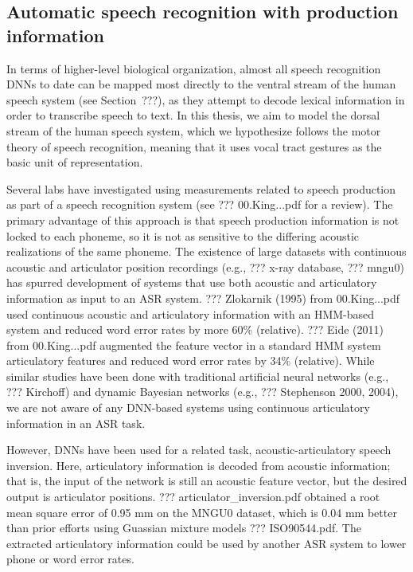 \subsection{Automatic speech recognition with production information}

In terms of higher-level biological organization,
almost all speech recognition DNNs to date
can be mapped most directly
to the ventral stream of the human speech system
(see Section~???),
as they attempt to decode
lexical information in order to
transcribe speech to text.
In this thesis, we aim to model
the dorsal stream of the human speech system,
which we hypothesize follows the
motor theory of speech recognition,
meaning that it uses vocal tract gestures
as the basic unit of representation.

Several labs have investigated
using measurements
related to speech production
as part of a speech recognition system
(see ??? 00.King...pdf for a review).
The primary advantage of this approach
is that speech production information
is not locked to each phoneme,
so it is not as sensitive to the
differing acoustic realizations
of the same phoneme.
The existence of large datasets
with continuous acoustic
and articulator position recordings
(e.g., ??? x-ray database, ??? mngu0)
has spurred development of
systems that use both
acoustic and articulatory information
as input to an ASR system.
??? Zlokarnik (1995) from 00.King...pdf
used continuous acoustic and articulatory
information with an HMM-based system
and reduced word error rates
by more 60\% (relative).
??? Eide (2011) from 00.King...pdf
augmented the feature vector
in a standard HMM system
articulatory features and
reduced word error rates
by 34\% (relative).
While similar studies have been done
with traditional artificial neural networks
(e.g., ??? Kirchoff)
and dynamic Bayesian networks
(e.g., ??? Stephenson 2000, 2004),
we are not aware of
any DNN-based systems using
continuous articulatory
information in an ASR task.

However, DNNs have been used for
a related task,
acoustic-articulatory speech inversion.
Here, articulatory information
is decoded from acoustic information;
that is, the input of the network
is still an acoustic feature vector,
but the desired output
is articulator positions.
??? articulator_inversion.pdf
obtained a root mean square error
of 0.95 mm on the MNGU0 dataset,
which is 0.04 mm better than prior
efforts using Guassian mixture models
??? ISO90544.pdf.
The extracted articulatory information
could be used by another ASR system
to lower phone or word error rates.

